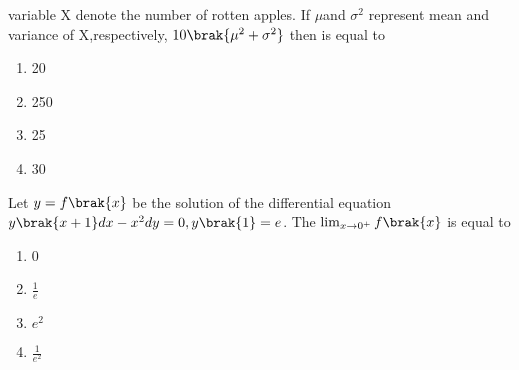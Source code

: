 variable X denote the number of rotten apples. If $\mu$and $\sigma^{2}$ represent mean and variance of X,respectively, $10\brak{\mu^{2}+\sigma^{2}}$ then  is equal to \hfill{}
\begin{enumerate}
    \item 20
    \item 250
    \item 25
    \item 30
\end{enumerate}
\item Let $y=f\brak{x}$ be the solution of the differential equation $y\brak{x+1}dx-x^{2}dy=0,y\brak{1}=e$. The $\lim_{x\to0^{+}}f\brak{x}$ is equal to  \hfill{}

\begin{enumerate}
    \item 0
    \item $\frac{1}{e}$
    \item $e^{2}$
    \item $\frac{1}{e^{2}}$
\end{enumerate}

